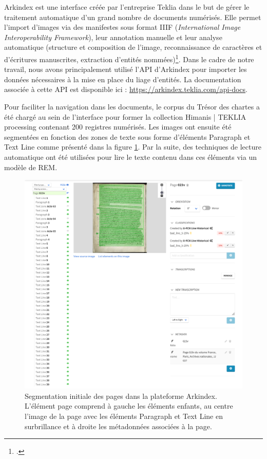 \documentclass[a4paper,12pt,twoside]{book}
\begin{document}
	Arkindex est une interface créée par l'entreprise Teklia dans le but de gérer le traitement automatique d'un grand nombre de documents numérisés. Elle permet l'import d'images via des manifestes sous format IIIF (\textit{International Image Interoperability Framework}), leur annotation manuelle et leur analyse automatique (structure et composition de l'image, reconnaissance de caractères et d'écritures manuscrites, extraction d'entités nommées)\footcite{noauthor_teklia_nodate}. Dans le cadre de notre travail, nous avons principalement utilisé l'API d'Arkindex pour importer les données nécessaires à la mise en place du liage d'entités. La documentation associée à cette API est disponible ici : \url{https://arkindex.teklia.com/api-docs}.
	
	Pour faciliter la navigation dans les documents, le corpus du Trésor des chartes a été chargé au sein de l'interface pour former la collection \og Himanis | TEKLIA processing\fg{} contenant 200 registres numérisés. Les images ont ensuite été segmentées en fonction des zones de texte sous forme d'éléments \og Paragraph\fg{} et \og Text Line\fg{} comme présenté dans la figure \ref{Page_Initiale_Arkindex}. Par la suite, des techniques de lecture automatique ont été utilisées pour lire le texte contenu dans ces éléments via un modèle de REM.
	
	\begin{figure}
		\centering
		\includegraphics[width=\textwidth]{Images/Interface_Arkindex.png}
		\caption{Segmentation initiale des pages dans la plateforme Arkindex. L'élément page comprend à gauche les éléments enfants, au centre l'image de la page avec les éléments \og Paragraph\fg{} et \og Text Line\fg{} en surbrillance et à droite les métadonnées associées à la page.}
		\label{Page_Initiale_Arkindex}
	\end{figure}
	
\end{document}
